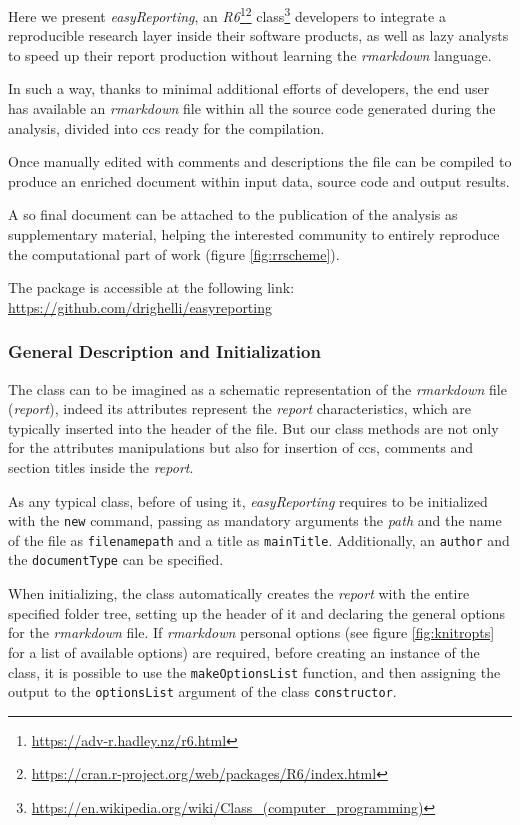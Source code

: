 Here we present \textit{easyReporting}, an \textit{R6}\footnote{\url{https://adv-r.hadley.nz/r6.html}}\footnote{\url{https://cran.r-project.org/web/packages/R6/index.html}} class\footnote{\url{https://en.wikipedia.org/wiki/Class_(computer_programming)}} developers to integrate a reproducible research layer inside their software products, as well as lazy analysts to speed up their report production without learning the \textit{rmarkdown} language.

In such a way, thanks to minimal additional efforts of developers, the end user has available an \textit{rmarkdown} file within all the source code generated during the analysis, divided into \glspl{cc} ready for the compilation.

Once manually edited with comments and descriptions the file can be compiled to produce an enriched document within input data, source code and output results.

A so final document can be attached to the publication of the analysis as supplementary material, helping the interested community to entirely reproduce the computational part of work (figure \ref{fig:rrscheme}). 

The package is accessible at the following link:\\ \href{https://github.com/drighelli/easyreporting}{https://github.com/drighelli/easyreporting} 

\subsubsection{General Description and Initialization}

The class can to be imagined as a schematic representation of the \textit{rmarkdown} file (\textit{report}), indeed 
its attributes represent the \textit{report} characteristics, which are typically inserted into the header of the file.
But our class methods are not only for the attributes manipulations but also for insertion of \glspl{cc}, comments and section titles inside the \textit{report}.

As any typical class, before of using it, \textit{easyReporting} requires to be initialized with the \lstinline!new! command, passing as mandatory arguments the \textit{path} and the name of the file as \lstinline!filenamepath! and a title as \lstinline!mainTitle!.
Additionally, an \lstinline!author! and the \lstinline!documentType! can be specified.

When initializing, the class automatically creates the \textit{report} with the entire specified folder tree, setting up the header of it and declaring the general options for the \textit{rmarkdown} file.
If \textit{rmarkdown} personal options (see figure \ref{fig:knitropts} for a list of available options) are required, before creating an instance of the class, it is possible to use the \lstinline!makeOptionsList! function, and then assigning the output to the \lstinline!optionsList! argument of the class \lstinline!constructor!.

